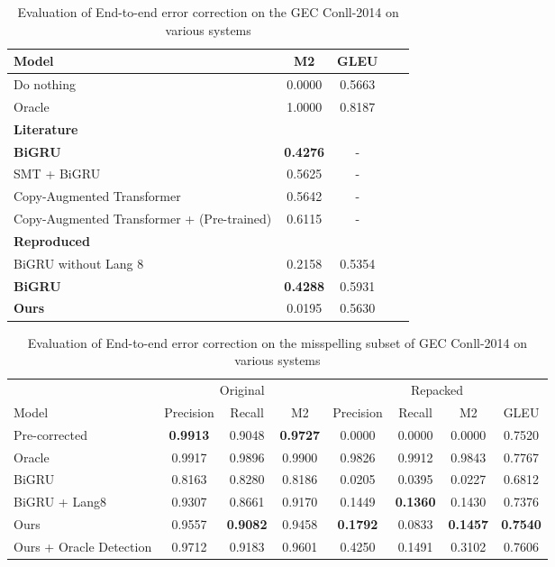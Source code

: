 \begin{table}
  \caption{Evaluation of End-to-end error correction on the GEC Conll-2014 on various systems}
  \label{tab:e2e_conll_all}
  \begin{tabular}{lcccc}
    \toprule
    Model & M2 & GLEU \\
    \midrule
    Do nothing & 0.0000 & 0.5663 \\
    Oracle & 1.0000 & 0.8187 \\
    \midrule
    \textbf{Literature} & \\
    \textbf{BiGRU} & \textbf{0.4276} & - \\
    SMT + BiGRU & 0.5625 & - \\
    Copy-Augmented Transformer & 0.5642	& - \\
    Copy-Augmented Transformer + (Pre-trained) & 0.6115 & - \\
    \midrule
    \textbf{Reproduced} & \\
    BiGRU without Lang 8 & 0.2158 & 0.5354 \\
    \textbf{BiGRU} & \textbf{0.4288} & 0.5931 \\
    \midrule
    \textbf{Ours} & 0.0195 & 0.5630 \\
    \bottomrule
\end{tabular}
\end{table}


\begin{table}
\caption{Evaluation of End-to-end error correction on the misspelling subset of GEC Conll-2014 on various systems}
  \label{tab:e2e_conll_misspell}
  \begin{tabular}{lccccccc}
    \toprule
    & \multicolumn{3}{c}{Original} & \multicolumn{4}{c}{Repacked}\\
    Model & Precision & Recall & M2 & Precision & Recall & M2 & GLEU\\
    \midrule
    Pre-corrected & \textbf{0.9913} & 0.9048 & \textbf{0.9727} & 0.0000 & 0.0000 & 0.0000 & 0.7520 \\
    Oracle & 0.9917 & 0.9896 & 0.9900 & 0.9826 & 0.9912 & 0.9843 & 0.7767 \\
    \midrule
    BiGRU & 0.8163 & 0.8280 & 0.8186 & 0.0205 & 0.0395 & 0.0227 & 0.6812 \\
    BiGRU + Lang8 & 0.9307 & 0.8661 & 0.9170 & 0.1449 & \textbf{0.1360} & 0.1430 & 0.7376 \\
    \midrule
    Ours & 0.9557 & \textbf{0.9082} & 0.9458 & \textbf{0.1792} & 0.0833 & \textbf{0.1457} & \textbf{0.7540} \\
    Ours + Oracle Detection & 0.9712 & 0.9183 & 0.9601 & 0.4250 & 0.1491 & 0.3102 & 0.7606 \\
    \bottomrule
\end{tabular}
\end{table}


